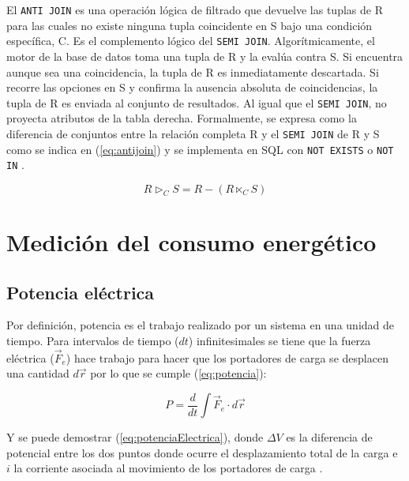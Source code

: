 \documentclass[12pt, letter paper]{report}
\begin{document}
        El \texttt{ANTI JOIN} es una operación lógica de filtrado que devuelve
        las tuplas de R para las cuales no existe ninguna tupla coincidente en S
        bajo una condición específica, C. Es el complemento lógico del
        \texttt{SEMI JOIN}. Algorítmicamente, el motor de la base de datos toma
        una tupla de R y la evalúa contra S. Si encuentra aunque sea una
        coincidencia, la tupla de R es inmediatamente descartada. Si recorre las
        opciones en S y confirma la ausencia absoluta de coincidencias, la tupla
        de R es enviada al conjunto de resultados. Al igual que el \texttt{SEMI
        JOIN}, no proyecta atributos de la tabla derecha. Formalmente, se
        expresa como la diferencia de conjuntos entre la relación completa R y
        el \texttt{SEMI JOIN} de R y S como se indica en (\ref{eq:antijoin}) y
        se implementa en SQL con \texttt{NOT EXISTS} o \texttt{NOT IN}
        \cite{garcia2009database}.

        \begin{equation}
          R \triangleright_{C} S = R - (R \ltimes_{C} S)
          \label{eq:antijoin}
        \end{equation}

    \section{Medición del consumo energético} %
    \label{sec:medición_del_consumo_energetico}
      \subsection{Potencia eléctrica} %
      \label{sub:potencia_eléctrica}
        Por definición, potencia es el trabajo realizado por un sistema en una
        unidad de tiempo. Para intervalos de tiempo ($dt$) infinitesimales se
        tiene que la fuerza eléctrica ($\vec{F}_e$) hace trabajo para hacer que
        los portadores de carga se desplacen una cantidad $d\vec{r}$ por lo que
        se cumple (\ref{eq:potencia}):

        \begin{equation}
          P = \dfrac{d}{dt} \int{\vec{F}_e \cdot d\vec{r}}
          \label{eq:potencia}
        \end{equation}

        Y se puede demostrar (\ref{eq:potenciaElectrica}), donde $\Delta V$ es
        la diferencia de potencial entre los dos puntos donde ocurre el
        desplazamiento total de la carga e $i$ la corriente asociada al
        movimiento de los portadores de carga \cite{sears2004fisica}.
\end{document}

